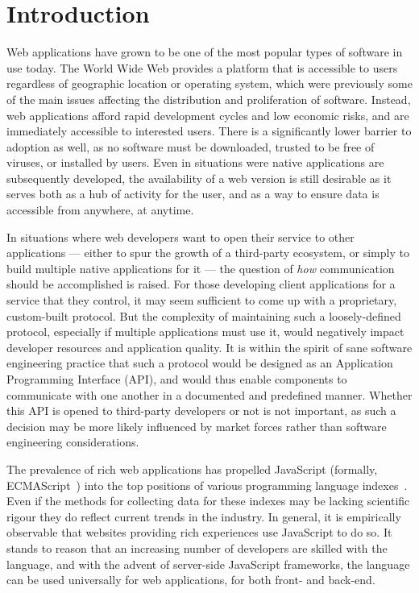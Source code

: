 \section{\label{sec:intro}Introduction}

Web applications have grown to be one of the most popular types of software in use today. The World Wide Web provides a platform that is accessible to users regardless of geographic location or operating system, which were previously some of the main issues affecting the distribution and proliferation of software. Instead, web applications afford rapid development cycles and low economic risks, and are immediately accessible to interested users. There is a significantly lower barrier to adoption as well, as no software must be downloaded, trusted to be free of viruses, or installed by users. Even in situations were native applications are subsequently developed, the availability of a web version is still desirable as it serves both as a hub of activity for the user, and as a way to ensure data is accessible from anywhere, at anytime.

In situations where web developers want to open their service to other applications --- either to spur the growth of a third-party ecosystem, or simply to build multiple native applications for it --- the question of \emph{how} communication should be accomplished is raised. For those developing client applications for a service that they control, it may seem sufficient to come up with a proprietary, custom-built protocol. But the complexity of maintaining such a loosely-defined protocol, especially if multiple applications must use it, would negatively impact developer resources and application quality. It is within the spirit of sane software engineering practice that such a protocol would be designed as an Application Programming Interface (API), and would thus enable components to communicate with one another in a documented and predefined manner. Whether this API is opened to third-party developers or not is not important, as such a decision may be more likely influenced by market forces rather than software engineering considerations.

The prevalence of rich web applications has propelled JavaScript (formally, ECMAScript~\cite{ecmascriptiso}) into the top positions of various programming language indexes~\cite{ghstats}\cite{tlpi}\cite{tiobe}. Even if the methods for collecting data for these indexes may be lacking scientific rigour they do reflect current trends in the industry. In general, it is empirically observable that websites providing rich experiences use JavaScript to do so. It stands to reason that an increasing number of developers are skilled with the language, and with the advent of server-side JavaScript frameworks, the language can be used universally for web applications, for both front- and back-end.

